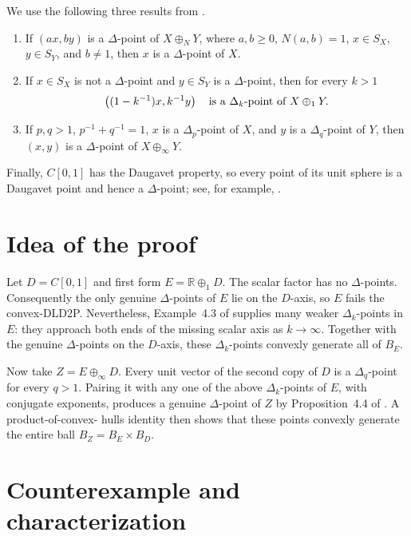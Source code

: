 \documentclass[11pt]{article}
\newcommand{\R}{\mathbb{R}}
\begin{document}
We use the following three results from \cite[Theorem~4.1, Example~4.3,
Proposition~4.4]{HPV}.

\begin{enumerate}
\item If $(ax,by)$ is a $\Delta$-point of $X\oplus_NY$, where
      $a,b\geq0$, $N(a,b)=1$, $x\in S_X$, $y\in S_Y$, and $b\neq1$,
      then $x$ is a $\Delta$-point of $X$.
\item If $x\in S_X$ is not a $\Delta$-point and $y\in S_Y$ is a
      $\Delta$-point, then for every $k>1$
      \[
      \left((1-k^{-1})x,k^{-1}y\right)
      \quad\hbox{is a $\Delta_k$-point of }X\oplus_1Y.
      \]
\item If $p,q>1$, $p^{-1}+q^{-1}=1$, $x$ is a $\Delta_p$-point of
      $X$, and $y$ is a $\Delta_q$-point of $Y$, then $(x,y)$ is a
      $\Delta$-point of $X\oplus_\infty Y$.
\end{enumerate}

Finally, $C[0,1]$ has the Daugavet property, so every point of its unit sphere
is a Daugavet point and hence a $\Delta$-point; see, for example,
\cite[Section~2]{KSSW}.

\section{Idea of the proof}

Let $D=C[0,1]$ and first form $E=\R\oplus_1D$.  The scalar factor has no
$\Delta$-points.  Consequently the only genuine $\Delta$-points of $E$ lie on
the $D$-axis, so $E$ fails the convex-DLD2P.  Nevertheless, Example~4.3 of
\cite{HPV} supplies many weaker $\Delta_k$-points in $E$: they approach both
ends of the missing scalar axis as $k\to\infty$.  Together with the genuine
$\Delta$-points on the $D$-axis, these $\Delta_k$-points convexly generate all
of $B_E$.

Now take $Z=E\oplus_\infty D$.  Every unit vector of the second copy of $D$
is a $\Delta_q$-point for every $q>1$.  Pairing it with any one of the above
$\Delta_k$-points of $E$, with conjugate exponents, produces a genuine
$\Delta$-point of $Z$ by Proposition~4.4 of \cite{HPV}.  A product-of-convex-
hulls identity then shows that these points convexly generate the entire ball
$B_Z=B_E\times B_D$.

\section{Counterexample and characterization}
\end{document}
